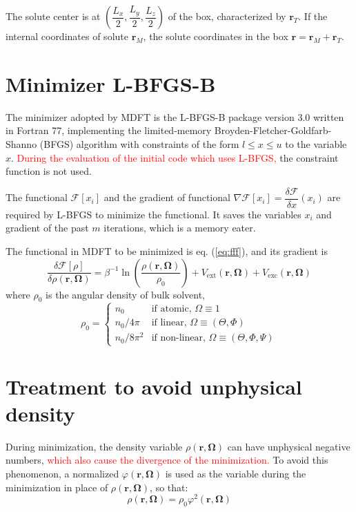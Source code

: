 The solute center is at $\left(\dfrac{L_{x}}{2},\dfrac{L_{y}}{2},\dfrac{L_{z}}{2}\right)$
of the box, characterized by $\mathbf{r}_{T}$. If the internal coordinates
of solute $\mathbf{r}_{M}$, the solute coordinates in the box $\mathbf{r}=\mathbf{r}_{M}+\mathbf{r}_{T}$.

\section{Minimizer L-BFGS-B}

The minimizer adopted by MDFT is the L-BFGS-B \citep{Zhu_1994_bfgs,Zhu_bfgs_1997_algorithm}
package version 3.0 written in Fortran 77, implementing the limited-memory
Broyden-Fletcher-Goldfarb-Shanno (BFGS) algorithm with constraints
of the form $l\leq x\leq u$ to the variable $x$. \textcolor{red}{During
the evaluation of the initial code which uses L-BFGS,} the constraint
function is not used.

The functional $\mathcal{F}[x_{i}]$ and the gradient of functional
$\nabla\mathcal{F}[x_{i}]=\dfrac{\delta\mathcal{F}}{\delta x}(x_{i})$
are required by L-BFGS to minimize the functional. It saves the variables
$x_{i}$ and gradient of the past $m$ iterations, which is a memory
eater.

The functional in MDFT to be minimized is eq. (\ref{eq:fff}), and
its gradient is
\begin{equation}
\frac{\delta\mathcal{F}[\rho]}{\delta\rho(\mathbf{r},\mathbf{\Omega})}=\beta^{-1}\ln\left(\dfrac{\rho(\mathbf{r},\mathbf{\Omega})}{\rho_{0}}\right)+V_{\mathrm{ext}}(\mathbf{r},\mathbf{\Omega})+V_{\mathrm{exc}}(\mathbf{r},\mathbf{\Omega})
\end{equation}
where $\rho_{0}$ is the angular density of bulk solvent, 
\begin{equation}
\rho_{0}=\left\{ \begin{array}{ll}
n_{0} & \mbox{if atomic, }\Omega\equiv1\\
n_{0}/4\pi & \mbox{if linear, }\Omega\equiv(\Theta,\Phi)\\
n_{0}/8\pi^{2} & \mbox{if non-linear, }\Omega\equiv(\Theta,\Phi,\Psi)
\end{array}\right.\label{eq:rho}
\end{equation}


\section{Treatment to avoid unphysical density}

During minimization, the density variable $\rho(\mathbf{r},\mathbf{\Omega})$
can have unphysical negative numbers, \textcolor{red}{which also cause
the divergence of the minimization.} To avoid this phenomenon, a normalized
$\varphi(\mathbf{r},\mathbf{\Omega})$ is used as the variable during
the minimization in place of $\rho(\mathbf{r},\mathbf{\Omega})$,
so that:
\begin{equation}
\rho(\mathbf{r},\mathbf{\Omega})=\rho_{0}\varphi^{2}(\mathbf{r},\mathbf{\Omega})\label{eq:cg_vect}
\end{equation}

